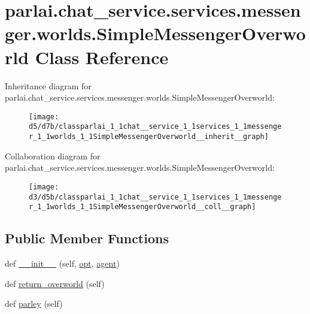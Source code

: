 \hypertarget{classparlai_1_1chat__service_1_1services_1_1messenger_1_1worlds_1_1SimpleMessengerOverworld}{}\section{parlai.\+chat\+\_\+service.\+services.\+messenger.\+worlds.\+Simple\+Messenger\+Overworld Class Reference}
\label{classparlai_1_1chat__service_1_1services_1_1messenger_1_1worlds_1_1SimpleMessengerOverworld}


Inheritance diagram for parlai.\+chat\+\_\+service.\+services.\+messenger.\+worlds.\+Simple\+Messenger\+Overworld\+:\nopagebreak
\begin{figure}[H]
\begin{center}
\leavevmode
\texttt{[image: d5/d7b/classparlai\_1\_1chat\_\_service\_1\_1services\_1\_1messenger\_1\_1worlds\_1\_1SimpleMessengerOverworld\_\_inherit\_\_graph]}
\end{center}
\end{figure}


Collaboration diagram for parlai.\+chat\+\_\+service.\+services.\+messenger.\+worlds.\+Simple\+Messenger\+Overworld\+:\nopagebreak
\begin{figure}[H]
\begin{center}
\leavevmode
\texttt{[image: d3/d5b/classparlai\_1\_1chat\_\_service\_1\_1services\_1\_1messenger\_1\_1worlds\_1\_1SimpleMessengerOverworld\_\_coll\_\_graph]}
\end{center}
\end{figure}
\subsection*{Public Member Functions}
\begin{DoxyCompactItemize}
\item 
def \hyperlink{classparlai_1_1chat__service_1_1services_1_1messenger_1_1worlds_1_1SimpleMessengerOverworld_a0081e4e70d79093a7a03ce0a29ef52fa}{\+\_\+\+\_\+init\+\_\+\+\_\+} (self, \hyperlink{classparlai_1_1chat__service_1_1services_1_1messenger_1_1worlds_1_1SimpleMessengerOverworld_a1d7cfe5c5771966cb486cfebaef576e8}{opt}, \hyperlink{classparlai_1_1chat__service_1_1services_1_1messenger_1_1worlds_1_1SimpleMessengerOverworld_ae8eee9f312b3a5998283087df1bda95f}{agent})
\item 
def \hyperlink{classparlai_1_1chat__service_1_1services_1_1messenger_1_1worlds_1_1SimpleMessengerOverworld_a69d3f1ced23ef51fae88d92ed5ea085b}{return\+\_\+overworld} (self)
\item 
def \hyperlink{classparlai_1_1chat__service_1_1services_1_1messenger_1_1worlds_1_1SimpleMessengerOverworld_a6de597ae2b81934e3d05a0480263f0db}{parley} (self)
\end{DoxyCompactItemize}
